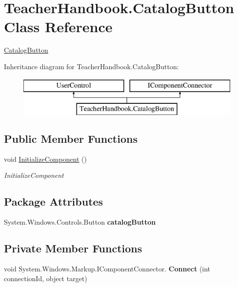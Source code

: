 \hypertarget{class_teacher_handbook_1_1_catalog_button}{}\section{Teacher\+Handbook.\+Catalog\+Button Class Reference}
\label{class_teacher_handbook_1_1_catalog_button}


\mbox{\hyperlink{class_teacher_handbook_1_1_catalog_button}{Catalog\+Button}}  


Inheritance diagram for Teacher\+Handbook.\+Catalog\+Button\+:\begin{figure}[H]
\begin{center}
\leavevmode
\includegraphics[height=2.000000cm]{d2/d3e/class_teacher_handbook_1_1_catalog_button}
\end{center}
\end{figure}
\subsection*{Public Member Functions}
\begin{DoxyCompactItemize}
\item 
void \mbox{\hyperlink{class_teacher_handbook_1_1_catalog_button_adb12d2ac86d6ce2674849f4fde4d4517}{Initialize\+Component}} ()
\begin{DoxyCompactList}\small\item\em Initialize\+Component \end{DoxyCompactList}\end{DoxyCompactItemize}
\subsection*{Package Attributes}
\begin{DoxyCompactItemize}
\item 
\mbox{\label{class_teacher_handbook_1_1_catalog_button_ac3f18f92030a50e2fb463d19c78f6cc0}} 
System.\+Windows.\+Controls.\+Button {\bfseries catalog\+Button}
\end{DoxyCompactItemize}
\subsection*{Private Member Functions}
\begin{DoxyCompactItemize}
\item 
\mbox{\label{class_teacher_handbook_1_1_catalog_button_a0accf252602f5a0dc642e299bb64b970}} 
void System.\+Windows.\+Markup.\+I\+Component\+Connector. {\bfseries Connect} (int connection\+Id, object target)
\end{DoxyCompactItemize}
